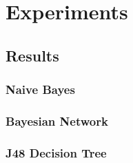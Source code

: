 \newpage
\chapter{Experiments}
\section{Results}
\subsection{Naive Bayes}
\subsection{Bayesian Network}
\subsection{J48 Decision Tree}